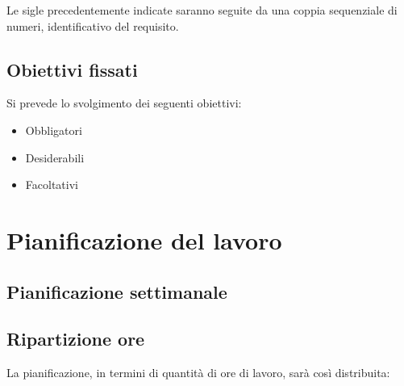 Le sigle precedentemente indicate saranno seguite da una coppia sequenziale di numeri, identificativo del requisito.

\subsection*{Obiettivi fissati}
Si prevede lo svolgimento dei seguenti obiettivi:
\begin{itemize}
	\item Obbligatori
	\begin{itemize}
		\obiettiviObbligatori
	\end{itemize}
	
	\item Desiderabili 
	\begin{itemize}
		\obiettiviDesiderabili
	\end{itemize}
	
	\item Facoltativi
	\begin{itemize}
		\obiettiviFacoltativi
	\end{itemize} 
\end{itemize}


\section{Pianificazione del lavoro}

\subsection*{Pianificazione settimanale}
\prospettoSettimanale

\subsection*{Ripartizione ore}
La pianificazione, in termini di quantità di ore di lavoro, sarà così distribuita:
\begin{center}
    
\end{center}

